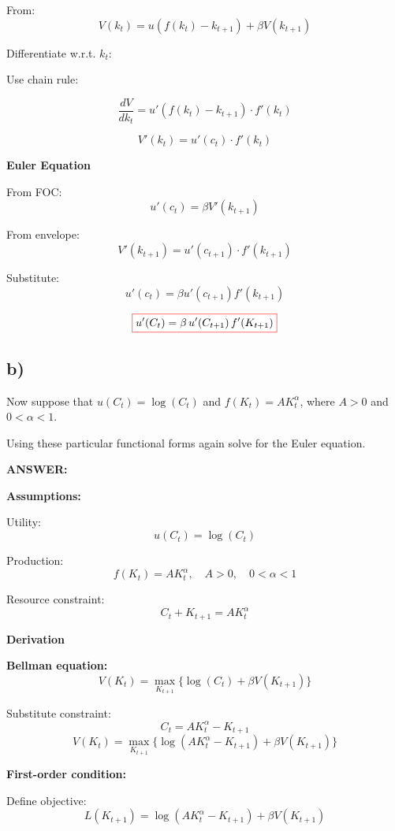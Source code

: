 \documentclass[12pt]{article}
\begin{document}
From:
\[
V(k_t) = u(f(k_t) - k_{t+1}) + \beta V(k_{t+1})
\]

Differentiate w.r.t. $k_t$:

Use chain rule:

\[
\frac{dV}{dk_t} = u'(f(k_t) - k_{t+1}) \cdot f'(k_t)
\]

\[
V'(k_t) = u'(c_t) \cdot f'(k_t)
\]

\vspace{0.5cm}
\textbf{Euler Equation}

From FOC:
\[
u'(c_t) = \beta V'(k_{t+1})
\]

From envelope:
\[
V'(k_{t+1}) = u'(c_{t+1}) \cdot f'(k_{t+1})
\]

Substitute:
\[
u'(c_t) = \beta u'(c_{t+1}) f'(k_{t+1})
\]

\[
\fcolorbox{red}{white}{$
\displaystyle u'(C_t)=\beta\,u'(C_{t+1})\,f'(K_{t+1})
$}
\]

\subsection*{\textbf{b)}}

Now suppose that \( u(C_t) = \log(C_t) \) and \( f(K_t) = A K_t^{\alpha} \), where \( A > 0 \) and \( 0 < \alpha < 1 \).

Using these particular functional forms again solve for the Euler equation.

\vspace{0.5em}
\noindent\textcolor{formalred}{\textbf{ANSWER:}}

\textbf{Assumptions:}

Utility:
\[
u(C_t) = \log(C_t)
\]

Production:
\[
f(K_t) = A K_t^{\alpha}, \quad A>0, \quad 0<\alpha<1
\]

Resource constraint:
\[
C_t + K_{t+1} = A K_t^{\alpha}
\]

\vspace{0.5em}
\textbf{Derivation}

\textbf{Bellman equation:}
\[
V(K_t)=\max_{K_{t+1}} \{ \log(C_t)+\beta V(K_{t+1}) \}
\]

Substitute constraint:
\[
C_t = A K_t^{\alpha} - K_{t+1}
\]
\[
V(K_t)=\max_{K_{t+1}} \{ \log(AK_t^{\alpha}-K_{t+1})+\beta V(K_{t+1}) \}
\]

\vspace{0.5em}
\textbf{First-order condition:}

Define objective:
\[
L(K_{t+1}) = \log(AK_t^{\alpha}-K_{t+1})+\beta V(K_{t+1})
\]
\end{document}
